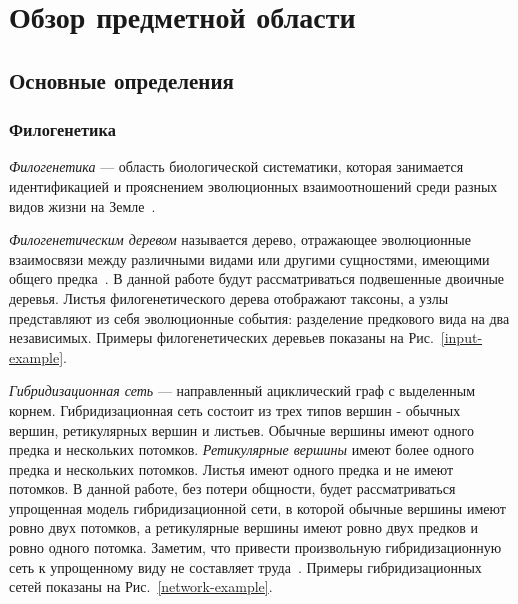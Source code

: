 \FloatBarrier
\chapter{Обзор предметной области}

\FloatBarrier
\section{Основные определения}

\subsection{Филогенетика}

\emph{Филогенетика} --- область биологической систематики, которая занимается идентификацией и прояснением эволюционных взаимоотношений среди разных видов жизни на Земле~\cite{wiki:phylogenetics}.

\emph{Филогенетическим деревом} называется дерево, отражающее эволюционные взаимосвязи между различными видами или другими сущностями, имеющими общего предка~\cite{wiki:phylogenetic-tree}.
В данной работе будут рассматриваться подвешенные двоичные деревья. Листья филогенетического дерева отображают таксоны, а узлы представляют из себя эволюционные события: разделение предкового вида на два независимых.
Примеры филогенетических деревьев показаны на Рис.~\ref{input-example}.

\emph{Гибридизационная сеть} --- направленный ациклический граф с выделенным корнем.
Гибридизационная сеть состоит из трех типов вершин - обычных вершин, ретикулярных вершин и листьев.
Обычные вершины имеют одного предка и нескольких потомков.
\emph{Ретикулярные вершины} имеют более одного предка и нескольких потомков.
Листья имеют одного предка и не имеют потомков.
В данной работе, без потери общности, будет рассматриваться упрощенная модель гибридизационной сети, в которой обычные вершины имеют ровно двух потомков, а ретикулярные вершины имеют ровно двух предков и ровно одного потомка. 
Заметим, что привести произвольную гибридизационную сеть к упрощенному виду не составляет труда~\cite{wu2010close}.
Примеры гибридизационных сетей показаны на Рис.~\ref{network-example}.

